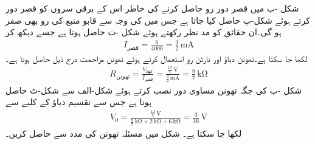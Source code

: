 شکل -ب میں قصر دور رو حاصل کرنے کی خاطر اس کے برقی سروں کو قصر دور کرتے ہوئے شکل-پ حاصل کیا جاتا ہے جس میں  کی  وجہ سے  قابو منبع کی رو بھی صفر ہو گی۔ان حقائق کو مد نظر رکھتے ہوئے شکل -ت حاصل ہوتا ہے جسے دیکھ کر 
\begin{align*}
I_{\text{قصر}}=\frac{6}{4000}=\frac{3}{2}\, \si{\milli\ampere}
\end{align*}
لکھا جا سکتا ہے۔تھونن دباؤ اور نارٹن رو استعمال کرتے ہوئے  تھونن مزاحمت درج ذیل حاصل ہوتا ہے۔
\begin{align*}
R_{\text{تھونن}}=\frac{V_{\text{کھلا}}}{I_{\text{قصر}}}  = \frac{\frac{12}{7} \, \si{\volt}}{\frac{3}{2} \, \si{\milli\ampere}}=\frac{8}{7} \, \si{\kilo\ohm}
\end{align*}
شکل -ب کی جگہ تھونن مساوی دور نصب کرتے ہوئے شکل-الف سے شکل-ٹ حاصل ہوتا ہے جس سے تقسیم دباؤ کے کلیے سے 
\begin{align*}
V_0=\frac{\frac{12}{7} \, \si{\volt}}{\frac{8}{7} \, \si{\kilo\ohm}+\SI{2}{\kilo\ohm}+\SI{6}{\kilo\ohm}}=\frac{3}{16} \, \si{\volt}
\end{align*}
لکھا جا سکتا ہے۔ 
شکل  میں مسئلہ تھونن کی مدد سے  حاصل کریں۔
